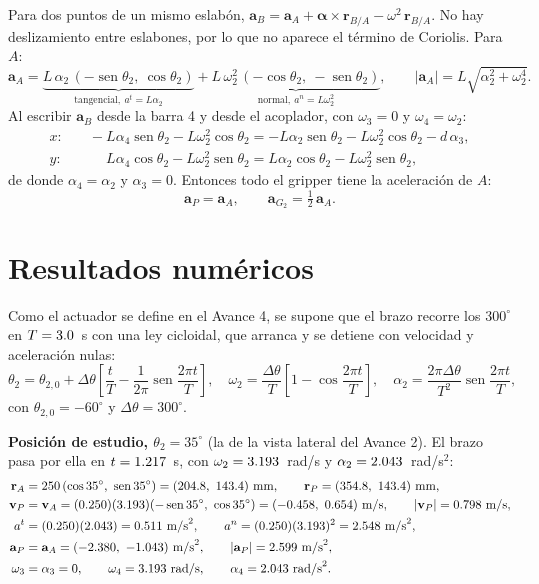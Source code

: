 \documentclass[11pt,a4paper]{article}
\newcommand{\sen}{\operatorname{sen}}
\begin{document}
Para dos puntos de un mismo eslabón,
$\mathbf{a}_B=\mathbf{a}_A+\boldsymbol{\alpha}\times\mathbf{r}_{B/A}-\omega^2\,\mathbf{r}_{B/A}$. No
hay deslizamiento entre eslabones, por lo que no aparece el término de Coriolis. Para $A$:
\begin{equation}
\mathbf{a}_A=\underbrace{L\,\alpha_2\,(-\sen\theta_2,\ \cos\theta_2)}_{\text{tangencial},\ a^t=L\alpha_2}
+\underbrace{L\,\omega_2^2\,(-\cos\theta_2,\ -\sen\theta_2)}_{\text{normal},\ a^n=L\omega_2^2},
\qquad |\mathbf{a}_A|=L\sqrt{\alpha_2^2+\omega_2^4}.
\end{equation}
Al escribir $\mathbf{a}_B$ desde la barra 4 y desde el acoplador, con $\omega_3=0$ y
$\omega_4=\omega_2$:
\begin{align}
x:&\quad -L\alpha_4\sen\theta_2-L\omega_2^2\cos\theta_2=-L\alpha_2\sen\theta_2-L\omega_2^2\cos\theta_2-d\,\alpha_3,\\
y:&\quad \phantom{-}L\alpha_4\cos\theta_2-L\omega_2^2\sen\theta_2=L\alpha_2\cos\theta_2-L\omega_2^2\sen\theta_2,
\end{align}
de donde $\alpha_4=\alpha_2$ y $\alpha_3=0$. Entonces todo el gripper tiene la aceleración de $A$:
\begin{equation}
\mathbf{a}_P=\mathbf{a}_A,\qquad \mathbf{a}_{G_2}=\tfrac12\,\mathbf{a}_A.
\end{equation}

\section{Resultados numéricos}

Como el actuador se define en el Avance 4, se supone que el brazo recorre los $300^\circ$ en
$T=3.0$~s con una ley cicloidal, que arranca y se detiene con velocidad y aceleración nulas:
\begin{equation}
\theta_2=\theta_{2,0}+\Delta\theta\left[\frac{t}{T}-\frac{1}{2\pi}\sen\frac{2\pi t}{T}\right],\quad
\omega_2=\frac{\Delta\theta}{T}\left[1-\cos\frac{2\pi t}{T}\right],\quad
\alpha_2=\frac{2\pi\Delta\theta}{T^2}\sen\frac{2\pi t}{T},
\end{equation}
con $\theta_{2,0}=-60^\circ$ y $\Delta\theta=300^\circ$.

\textbf{Posición de estudio, $\theta_2=35^\circ$} (la de la vista lateral del Avance 2). El brazo pasa
por ella en $t=1.217$~s, con $\omega_2=3.193$~rad/s y $\alpha_2=2.043$~rad/s$^2$:
\begin{align*}
\mathbf{r}_A&=250\,(\cos35^\circ,\ \sen35^\circ)=(\vxAest,\ \vyAest)~\text{mm},\qquad
\mathbf{r}_P=(\vxPest,\ \vyAest)~\text{mm},\\
\mathbf{v}_P&=\mathbf{v}_A=(0.250)(\vwest)(-\sen35^\circ,\ \cos35^\circ)=(\vvAxest,\ \vvAyest)~\text{m/s},
\qquad |\mathbf{v}_P|=\vvAest~\text{m/s},\\
a^t&=(0.250)(\vaest)=\vatest~\text{m/s}^2,\qquad a^n=(0.250)(\vwest)^2=\vanest~\text{m/s}^2,\\
\mathbf{a}_P&=\mathbf{a}_A=(\vaAxest,\ \vaAyest)~\text{m/s}^2,\qquad |\mathbf{a}_P|=\vaAest~\text{m/s}^2,\\
\omega_3&=\alpha_3=0,\qquad \omega_4=\vwest~\text{rad/s},\qquad \alpha_4=\vaest~\text{rad/s}^2.
\end{align*}
\end{document}
